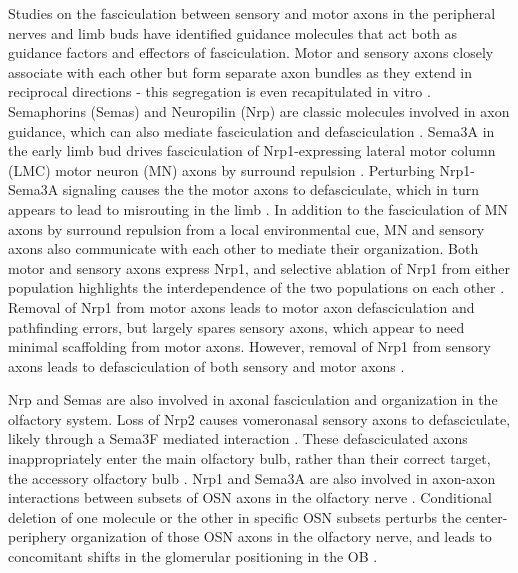 Studies on the fasciculation between sensory and motor axons in the peripheral nerves and limb buds have identified guidance molecules that act both as guidance factors and effectors of fasciculation.
Motor and sensory axons closely associate with each other but form separate axon bundles as they extend in reciprocal directions - this segregation is even recapitulated in vitro \cite{gallarda2008segregation}.
Semaphorins (Semas) and Neuropilin (Nrp) are classic molecules involved in axon guidance, which can also mediate fasciculation and defasciculation \cite{raper2000semaphorins,bashaw2010signaling,kolodkin2011mechanisms}.
Sema3A in the early limb bud drives fasciculation of Nrp1-expressing lateral motor column (LMC) motor neuron (MN) axons by surround repulsion \cite{huber2005distinct}.
Perturbing Nrp1-Sema3A signaling causes the the motor axons to defasciculate, which in turn appears to lead to misrouting in the limb \cite{huber2005distinct}.
In addition to the fasciculation of MN axons by surround repulsion from a local environmental cue, MN and sensory axons also communicate with each other to mediate their organization.
Both motor and sensory axons express Nrp1, and selective ablation of Nrp1 from either population highlights the interdependence of the two populations on each other \cite{huettl2011npn}.
Removal of Nrp1 from motor axons leads to motor axon defasciculation and pathfinding errors, but largely spares sensory axons, which appear to need minimal scaffolding from motor axons.
However, removal of Nrp1 from sensory axons leads to defasciculation of both sensory and motor axons \cite{huettl2011npn}.

Nrp and Semas are also involved in axonal fasciculation and organization in the olfactory system.
Loss of Nrp2 causes vomeronasal sensory axons to defasciculate, likely through a Sema3F mediated interaction \cite{cloutier2002neuropilin}.
These defasciculated axons inappropriately enter the main olfactory bulb, rather than their correct target, the accessory olfactory bulb \cite{cloutier2002neuropilin}.
Nrp1 and Sema3A are also involved in axon-axon interactions between subsets of OSN axons in the olfactory nerve \cite{imai2009pre}.
Conditional deletion of one molecule or the other in specific OSN subsets perturbs the center-periphery organization of those OSN axons in the olfactory nerve, and leads to concomitant shifts in the glomerular positioning in the OB \cite{imai2009pre}.

